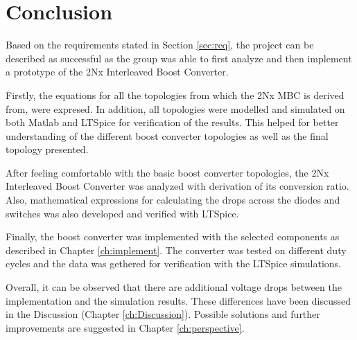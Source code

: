 \chapter{Conclusion}\label{ch:conclusion}
Based on the requirements stated in Section \ref{sec:req}, the project can be described as successful as the group was able to first analyze and then implement a prototype of the 2Nx Interleaved Boost Converter.

Firstly, the equations for all the topologies from which the 2Nx MBC is derived from, were expresed. In addition, all topologies were modelled and simulated on both Matlab and LTSpice for verification of the results. This helped for better understanding of the different boost converter topologies as well as the final topology presented.

After feeling comfortable with the basic boost converter topologies, the 2Nx Interleaved Boost Converter was analyzed with derivation of its conversion ratio. Also, mathematical expressions for calculating the drops across the diodes and switches was also developed and verified with LTSpice.

Finally, the boost converter was implemented with the selected components as described in Chapter \ref{ch:implement}. The converter was tested on different duty cycles and the data was gethered for verification with the LTSpice simulations.

Overall, it can be observed that there are additional voltage drops between the implementation and the simulation results. These differences have been discussed in the Discussion (Chapter \ref{ch:Discussion}). Possible solutions and further improvements are suggested in Chapter \ref{ch:perspective}.